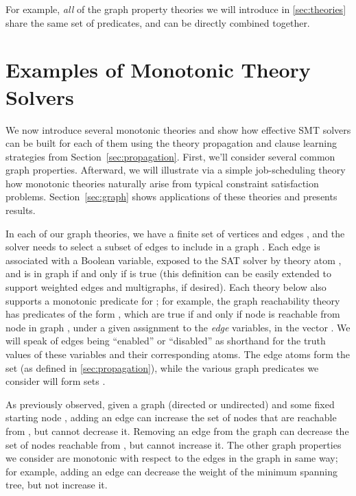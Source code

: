 \documentclass[runningheads]{llncs}
\begin{document}
{\begin{enumerate}
For example, \textit{all} of the graph property theories we will introduce in \autoref{sec:theories} share the same set  of  predicates, and can be directly combined together.

\end{enumerate}
}

\section{Examples of Monotonic Theory Solvers \label{sec:theories}}

We now introduce several monotonic theories and show how effective SMT
solvers can be built for each of them using the theory propagation and
clause learning strategies from Section~\ref{sec:propagation}.  First,
we'll consider several common graph properties.
Afterward, we will illustrate via a simple job-scheduling theory
how monotonic theories naturally arise from
typical constraint satisfaction problems.
Section~\ref{sec:graph} shows applications of these theories
and presents results.

In each of our graph theories, we have a finite set of vertices 
and edges ,
and the solver needs to select a subset of edges to include in a graph .
Each edge  is associated with a Boolean variable, exposed to the SAT solver by theory
atom , and is in graph  if and only if
 is true (this definition can be easily extended to
support weighted edges and multigraphs, if desired). Each theory below
also supports a monotonic predicate for ; for example, the graph
reachability theory has predicates of the form , which are
true if and only if node  is reachable from node  in graph ,
under a given assignment to the \textit{edge} variables, in the vector . We will speak of
edges being ``enabled'' or ``disabled'' as shorthand for the truth values of
these  variables and their corresponding atoms. The edge atoms form the set  (as defined in \autoref{sec:propagation}), while the various graph predicates we consider will form sets .

As previously observed, given a graph (directed or undirected) and some fixed starting node , adding an edge can increase the set of nodes that are reachable from , but cannot decrease it.  Removing an edge from the graph can decrease the set of nodes reachable from , but cannot increase it. The other graph properties we consider are monotonic with respect to the edges in the graph in same way; for example, adding an edge can decrease the weight of the minimum spanning tree, but not increase it. 
\end{document}
